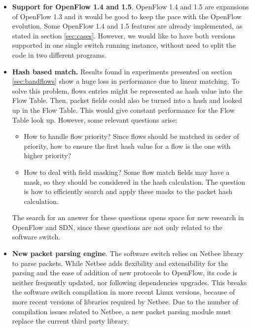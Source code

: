 \begin{itemize}

\item \textbf{Support for OpenFlow 1.4 and 1.5}. OpenFlow 1.4 and 1.5 are expansions of OpenFlow 1.3 and it would be good to keep the pace with the OpenFlow evolution. Some OpenFlow 1.4 and 1.5 features are already implemented, as stated in section \ref{sec:cases}. However, we would like to have both versions supported in one single switch running instance, without need to split the code in two different programs.

\item \textbf{Hash based match.} Results found in experiments presented on section \ref{sec:bandflows} show a huge loss in performance due to linear matching. To solve this problem, flows entries might be represented as hash value into the Flow Table. Then, packet fields could also be turned into a hash and looked up in the Flow Table. This would give constant performance for the Flow Table look up. However, some relevant questions arise: 

    \begin{itemize}
    \item How to handle flow priority? Since flows should be matched in order of priority, how to ensure the first hash value for a flow is the one with higher priority? 
    \item How to deal with field masking? Some flow match fields may have a mask, so they should be considered in the hash calculation. The question is how to efficiently search and apply these masks to the packet hash calculation. 
    \end{itemize}

The search for an answer for these questions opens space for new research in OpenFlow and SDN, since these questions are not only related to the software switch. 
  
\item \textbf{New packet parsing engine}. The software switch relies on Netbee library to parse packets. While Netbee adds flexibility and extensibility for the parsing and the ease of addition of new protocols to OpenFlow, its code is neither frequently updated, nor following dependencies upgrades. This breaks the software switch compilation in more recent Linux versions, because of more recent versions of libraries required by Netbee. Due to the number of compilation issues related to Netbee, a new packet parsing module must replace the current third party library.

\end{itemize}

